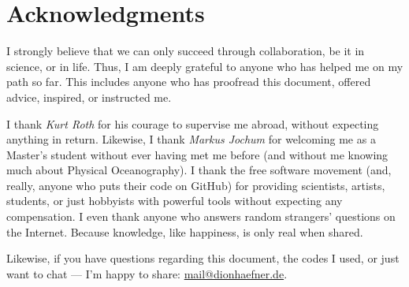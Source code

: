 
\null
\vspace{4\onelineskip}


\vspace{2\onelineskip}

\begingroup
\let\clearpage\relax

\section*{Acknowledgments}

I strongly believe that we can only succeed through collaboration, be it in science, or in life. Thus, I am deeply grateful to anyone who has helped me on my path so far. This includes anyone who has proofread this document, offered advice, inspired, or instructed me. 

I thank \emph{Kurt Roth} for his courage to supervise me abroad, without expecting anything in return. Likewise, I thank \emph{Markus Jochum} for welcoming me as a Master's student without ever having met me before (and without me knowing much about Physical Oceanography). I thank the free software movement (and, really, anyone who puts their code on GitHub) for providing scientists, artists, students, or just hobbyists with powerful tools without expecting any compensation. I even thank anyone who answers random strangers' questions on the Internet. Because knowledge, like happiness, is only real when shared.

Likewise, if you have questions regarding this document, the codes I used, or just want to chat --- I'm happy to share: \href{mailto:mail@dionhaefner.de}{mail@dionhaefner.de}.
\endgroup